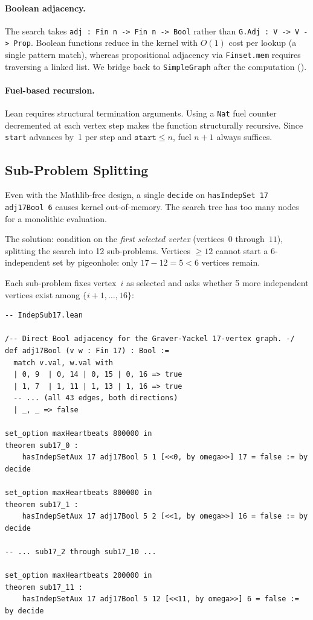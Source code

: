 \documentclass[11pt]{article}
\newcommand{\lean}[1]{\texttt{#1}}
\begin{document}
\paragraph{Boolean adjacency.}
The search takes \lean{adj : Fin n -> Fin n -> Bool} rather than
\lean{G.Adj : V -> V -> Prop}.
Boolean functions reduce in the kernel with $O(1)$ cost per lookup
(a single pattern match), whereas propositional adjacency via
\lean{Finset.mem} requires traversing a linked list.
We bridge back to \lean{SimpleGraph} after the computation
().

\paragraph{Fuel-based recursion.}
Lean requires structural termination arguments.
Using a \lean{Nat} fuel counter decremented at each vertex step
makes the function structurally recursive.
Since \lean{start} advances by~1 per step and $\lean{start} \leq n$,
fuel $n+1$ always suffices.

\subsection{Sub-Problem Splitting}
\label{sec:checker:split}

Even with the Mathlib-free design, a single \lean{decide} on
\lean{hasIndepSet 17 adj17Bool 6} causes kernel out-of-memory.
The search tree has too many nodes for a monolithic evaluation.

The solution: condition on the \emph{first selected vertex} (vertices~$0$
through~$11$), splitting the search into 12 sub-problems.
Vertices $\geq 12$ cannot start a 6-independent set by pigeonhole:
only $17 - 12 = 5 < 6$ vertices remain.

Each sub-problem fixes vertex~$i$ as selected and asks whether 5 more
independent vertices exist among $\{i+1,\ldots,16\}$:

\begin{lstlisting}
-- IndepSub17.lean

/-- Direct Bool adjacency for the Graver-Yackel 17-vertex graph. -/
def adj17Bool (v w : Fin 17) : Bool :=
  match v.val, w.val with
  | 0, 9  | 0, 14 | 0, 15 | 0, 16 => true
  | 1, 7  | 1, 11 | 1, 13 | 1, 16 => true
  -- ... (all 43 edges, both directions)
  | _, _ => false

set_option maxHeartbeats 800000 in
theorem sub17_0 :
    hasIndepSetAux 17 adj17Bool 5 1 [<<0, by omega>>] 17 = false := by decide

set_option maxHeartbeats 800000 in
theorem sub17_1 :
    hasIndepSetAux 17 adj17Bool 5 2 [<<1, by omega>>] 16 = false := by decide

-- ... sub17_2 through sub17_10 ...

set_option maxHeartbeats 200000 in
theorem sub17_11 :
    hasIndepSetAux 17 adj17Bool 5 12 [<<11, by omega>>] 6 = false := by decide
\end{lstlisting}
\end{document}
